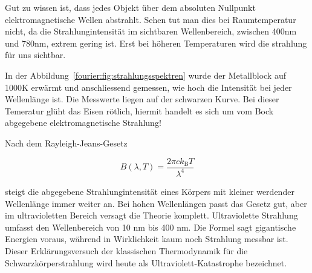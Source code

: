 	Gut zu wissen ist, dass jedes Objekt über dem absoluten Nullpunkt elektromagnetische Wellen abstrahlt. 
	Sehen tut man dies bei Raumtemperatur nicht, da die Strahlungintensität im sichtbaren Wellenbereich, zwischen 400nm und 780nm, extrem gering ist. 
	Erst bei höheren Temperaturen wird die strahlung für uns sichtbar. 
	
	
	
	In der Abbildung~\ref{fourier:fig:strahlungsspektren} wurde der Metallblock auf 1000K erwärmt und anschliessend gemessen, wie hoch die Intensität bei jeder Wellenlänge ist. 
	Die Messwerte liegen auf der schwarzen Kurve.
	Bei dieser Temeratur glüht das Eisen rötlich, hiermit handelt es sich um vom Bock abgegebene elektromagnetische Strahlung!
	
	
	Nach dem Rayleigh-Jeans-Gesetz 
	
	\begin{equation}
		B(\lambda, T) = \frac{2 \pi c k_\mathrm{B} T}{\lambda^4}
	\end{equation}
	
	steigt die abgegebene Strahlungintensität eines Körpers mit kleiner werdender Wellenlänge immer weiter an. 
	Bei hohen Wellenlängen passt das Gesetz gut, aber im ultravioletten Bereich versagt die Theorie komplett. Ultraviolette Strahlung umfasst den Wellenbereich von 10 nm bis 400 nm. 
	Die Formel sagt gigantische Energien voraus, während in Wirklichkeit kaum noch Strahlung messbar ist. 
	Dieser Erklärungsversuch der klassischen Thermodynamik für die Schwarzkörperstrahlung wird heute als Ultraviolett-Katastrophe bezeichnet. 
	
	
	
